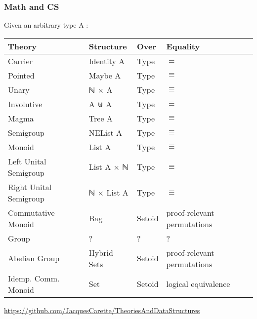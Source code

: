 \documentclass[serif,mathserif,professionalfont,10pt]{beamer}
\begin{document}
\begin{frame}
\frametitle{Math and CS}
Given an arbitrary type A : \\ \vspace*{4mm}
\begin{tabular}{llll}
\textbf{Theory} & \textbf{Structure} & Over & Equality \\ \hline
Carrier & Identity A & Type  & $\equiv$ \\
Pointed & Maybe A & Type & $\equiv$\\ \hline
Unary & ℕ × A &  Type & $\equiv$\\
Involutive & A ⊎ A & Type & $\equiv$ \\ \hline
Magma & Tree A &  Type & $\equiv$\\
Semigroup & NEList A & Type & $\equiv$\\ \hline
Monoid & List A & Type & $\equiv$\\
Left Unital Semigroup & List A × ℕ & Type & $\equiv$\\
Right Unital Semigroup & ℕ × List A & Type & $\equiv$\\ \hline
Commutative Monoid & Bag & Setoid &  proof-relevant permutations \\
Group & ? & ? & ? \\
Abelian Group & Hybrid Sets & Setoid &  proof-relevant permutations\\
Idemp. Comm. Monoid & Set & Setoid &  logical equivalence \\
\end{tabular}

\vspace*{3mm}
\url{https://github.com/JacquesCarette/TheoriesAndDataStructures}
\end{frame}
\end{document}
